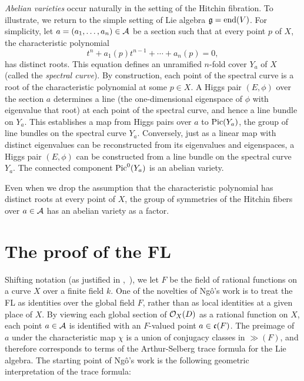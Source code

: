 {\it Abelian varieties} occur naturally in the setting of the Hitchin
fibration.  To illustrate, we return to the simple setting of Lie
algebra $\gg=\op{end}(V)$.  For simplicity, let $a=(a_1,\ldots,a_n)\in
\AA$ be a section such that at every point $p$ of $X$, the characteristic
polynomial 
\begin{equation}\label{eqn:spectral}
t^n + a_1(p) t^{n-1} + \cdots+ a_n(p)=0,
\end{equation} 
has distinct roots.  This equation defines an unramified $n$-fold
cover $Y_a$ of $X$ (called the {\it spectral curve}).  By
construction, each point of the spectral curve is a root of the
characteristic polynomial at some $p\in X$.  A Higgs pair $(E,\phi)$
over the section $a$ determines a line (the one-dimensional eigenspace
of $\phi$ with eigenvalue that root) at each point of the spectral curve,
and hence a line bundle on $Y_a$.  This establishes a map from
Higgs pairs over $a$ to $\op{Pic}(Y_a)$, the group of line
bundles on the spectral curve $Y_a$.  Conversely, just as a
linear map with distinct eigenvalues can be reconstructed from its
eigenvalues and eigenspaces, a Higgs pair $(E,\phi)$ can be
constructed from a line bundle on the spectral curve $Y_a$.
The connected component $\op{Pic}^0(Y_a)$ is an abelian
variety.

Even when we drop the assumption that the characteristic polynomial
has distinct roots at every point of $X$, the group of symmetries of
the Hitchin fibers over $a\in\AA$ has an abelian
variety as a factor.


\section{The proof of the FL}

Shifting notation (as justified in \cite{Wald:2006},~\cite{CHL:2010}),
we let $F$ be the field of rational functions on a curve $X$ over a
finite field $k$.  One of the novelties of Ng\^o's work is to treat
the FL as identities over the global field $F$, rather than as local
identities at a given place of $X$.
By viewing each global section of $\OO_X(D)$ as a
rational function on $X$, each point $a\in{\AA}$ is identified with an
$F$-valued point $a\in \cc(F)$.  The preimage of $a$ under the
characteristic map $\chi$ is a union of conjugacy classes in $\gg(F)$,
and therefore corresponds to terms of the Arthur-Selberg trace formula
for the Lie algebra.  The starting point of Ng\^o's work is the
following geometric interpretation of the trace formula:

